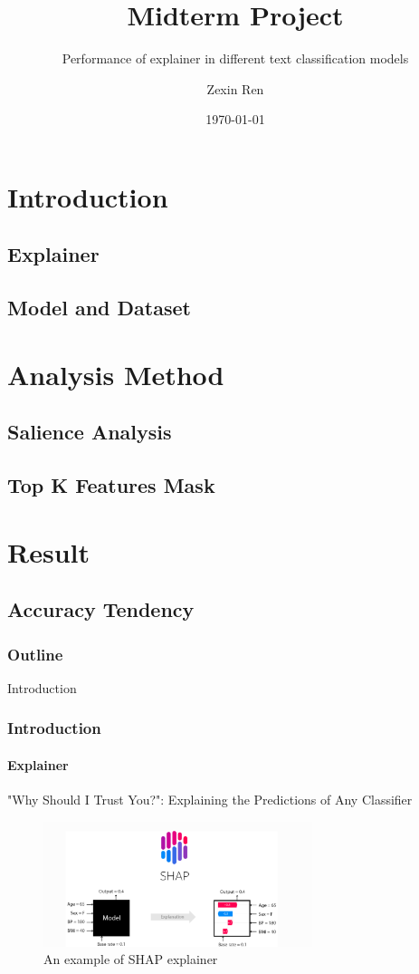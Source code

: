 \documentclass{beamer}
\title{Midterm Project}
\subtitle{Performance of explainer in different text classification models}
\author{Zexin Ren}
\date{\today}
\begin{document}
\begin{frame}
    \titlepage

\end{frame}

\section{Introduction}
\subsection{Explainer}
\subsection{Model and Dataset}
\section{Analysis Method}
\subsection{Salience Analysis}
\subsection{Top K Features Mask}


\section{Result}
\subsection{Accuracy Tendency}



\begin{frame}
    \frametitle{Outline}
    \tableofcontents
\end{frame}


\begin{frame}{Introduction}
\frametitle{Introduction}
\framesubtitle{Explainer}
"Why Should I Trust You?": Explaining the Predictions of Any Classifier
\begin{figure}
    \centering
        \includegraphics[width=0.7\textwidth]{ExplainerIntroduction.png}
        \caption{An example of SHAP explainer}
        \label{fig:ExplainerIntroduction}
    \end{figure}
\end{frame}
\end{document}
